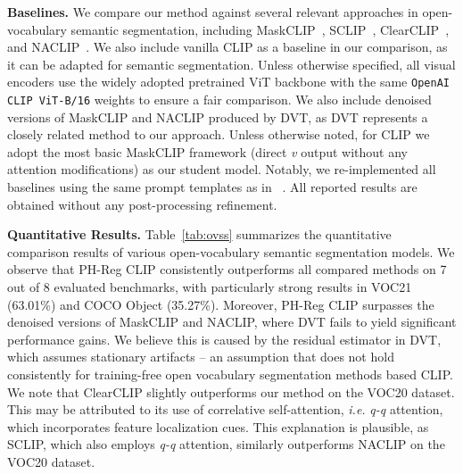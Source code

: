 \textbf{Baselines.} We compare our method against several relevant approaches in open-vocabulary semantic segmentation, including MaskCLIP~\citep{zhou2022extract}, SCLIP~\citep{wang2024scliprethinkingselfattentiondense}, ClearCLIP~\citep{lan2024clearclip}, and NACLIP~\citep{hajimiri2025naclip}. We also include vanilla CLIP as a baseline in our comparison, as it can be adapted for semantic segmentation. Unless otherwise specified, all visual encoders use the widely adopted pretrained ViT backbone with the same \texttt{OpenAI CLIP ViT-B/16} weights to ensure a fair comparison. We also include denoised versions of MaskCLIP and NACLIP produced by DVT, as DVT represents a closely related method to our approach. Unless otherwise noted, for CLIP we adopt the most basic MaskCLIP framework (direct \textit{v} output without any attention modifications) as our student model.
Notably, we re-implemented all baselines using the same prompt templates as in ~\cite{wang2024scliprethinkingselfattentiondense, hajimiri2025naclip}. All reported results are obtained without any post-processing refinement. 

\textbf{Quantitative Results.} Table~\ref{tab:ovss} summarizes the quantitative comparison results of various open-vocabulary semantic segmentation models. We observe that PH-Reg CLIP consistently outperforms all compared methods on 7 out of 8 evaluated benchmarks, with particularly strong results in VOC21 (63.01\%) and COCO Object (35.27\%). Moreover, PH-Reg CLIP surpasses the denoised versions of MaskCLIP and NACLIP, where DVT fails to yield significant performance gains. We believe this is caused by the residual estimator in DVT, which assumes stationary artifacts -- an assumption that does not hold consistently for training-free open vocabulary segmentation methods based CLIP. We note that ClearCLIP slightly outperforms our method on the VOC20 dataset. This may be attributed to its use of correlative self-attention, \emph{i.e.} \emph{q-q} attention, which incorporates feature localization cues. This explanation is plausible, as SCLIP, which also employs \emph{q-q} attention, similarly outperforms NACLIP on the VOC20 dataset.

